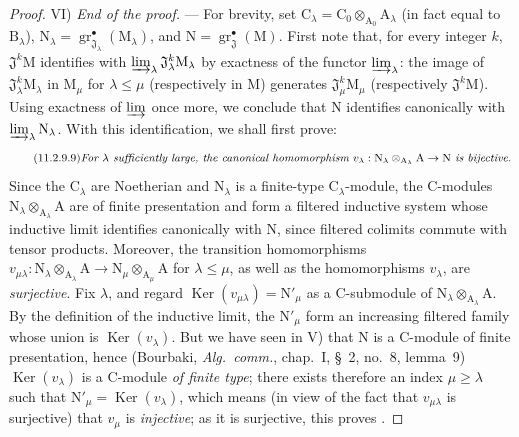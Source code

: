 \begin{proof}
\medskip
\noindent VI) \emph{End of the proof.} --- For brevity, set $\mathrm{C}_\lambda=\mathrm{C}_0\otimes_{\mathrm{A}_0}\mathrm{A}_\lambda$ (in fact equal to $\mathrm{B}_\lambda$), $\mathrm{N}_\lambda=\operatorname{gr}^\bullet_{\mathfrak{J}_\lambda}(\mathrm{M}_\lambda)$, and $\mathrm{N}=\operatorname{gr}^\bullet_\mathfrak{J}(\mathrm{M})$. First note that, for every integer $k$, $\mathfrak{J}^k\mathrm{M}$ identifies with $\varinjlim_\lambda\mathfrak{J}_\lambda^k\mathrm{M}_\lambda$ by exactness of the functor $\varinjlim_\lambda$: the image of $\mathfrak{J}_\lambda^k\mathrm{M}_\lambda$ in $\mathrm{M}_\mu$ for $\lambda\leqslant\mu$ (respectively in $\mathrm{M}$) generates $\mathfrak{J}_\mu^k\mathrm{M}_\mu$ (respectively $\mathfrak{J}^k\mathrm{M}$). Using exactness of $\varinjlim$ once more, we conclude that $\mathrm{N}$ identifies canonically with $\varinjlim_\lambda\mathrm{N}_\lambda$. With this identification, we shall first prove:
\begin{equation}
\label{IV.11.2.9.9}
\tag{11.2.9.9}
\text{\emph{For $\lambda$ sufficiently large, the canonical homomorphism $v_\lambda:\mathrm{N}_\lambda\otimes_{\mathrm{A}_\lambda}\mathrm{A}\to\mathrm{N}$ is bijective.}}
\end{equation}
Since the $\mathrm{C}_\lambda$ are Noetherian and $\mathrm{N}_\lambda$ is a finite-type $\mathrm{C}_\lambda$-module, the $\mathrm{C}$-modules $\mathrm{N}_\lambda\otimes_{\mathrm{A}_\lambda}\mathrm{A}$ are of finite presentation and form a filtered inductive system whose inductive limit identifies canonically with $\mathrm{N}$, since filtered colimits commute with tensor products. Moreover, the transition homomorphisms $v_{\mu\lambda}:\mathrm{N}_\lambda\otimes_{\mathrm{A}_\lambda}\mathrm{A}\to\mathrm{N}_\mu\otimes_{\mathrm{A}_\mu}\mathrm{A}$
for $\lambda\leqslant\mu$, as well as the homomorphisms $v_\lambda$, are
\emph{surjective}. Fix $\lambda$, and regard $\operatorname{Ker}(v_{\mu\lambda})=\mathrm{N}'_\mu$
as a $\mathrm{C}$-submodule of
$\mathrm{N}_\lambda\otimes_{\mathrm{A}_\lambda}\mathrm{A}$. By the
definition of the inductive limit, the $\mathrm{N}'_\mu$ form an
increasing filtered family whose union is $\operatorname{Ker}(v_\lambda)$.
But we have seen in V) that $\mathrm{N}$ is a $\mathrm{C}$-module of finite
presentation, hence (Bourbaki, \emph{Alg.\ comm.}, chap.~I, \S~2, no.~8, lemma~9)
$\operatorname{Ker}(v_\lambda)$ is a $\mathrm{C}$-module \emph{of finite type}; there
exists therefore an index $\mu\geqslant\lambda$ such that
$\mathrm{N}'_\mu=\operatorname{Ker}(v_\lambda)$, which means (in view of the fact that $v_{\mu\lambda}$ is
surjective) that $v_\mu$ is \emph{injective}; as it is surjective, this
proves .


\end{proof}
